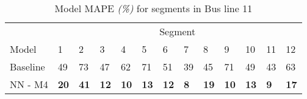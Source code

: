 \begin{table}[H]
	\centering
	\caption{Model MAPE \textit{(\%)} for segments in Bus line 11}
	\label{fig:model-mape-of-segs-211}
	\begin{adjustbox}{center}
	\begin{tabular}{ l | l | l | l | l | l | l | l | l | l | l | l | l}
		& \multicolumn{12}{c}{Segment} \\
		Model       & 1 & 2 & 3 & 4 & 5 & 6 & 7 & 8 & 9 & 10 & 11 & 12 \\
		\hline
		Baseline  & 49 & 73 & 47 & 62 & 71 & 51 & 39 & 45 & 71 & 49  & 43 & 63 \\
		NN - M4         & \textbf{20}& \textbf{41}& \textbf{12}& \textbf{10}& \textbf{13}& \textbf{12}& \textbf{8}& \textbf{19}& \textbf{10}& \textbf{13}& \textbf{9}& \textbf{17}\\
	\end{tabular}
	\end{adjustbox}
\end{table}





